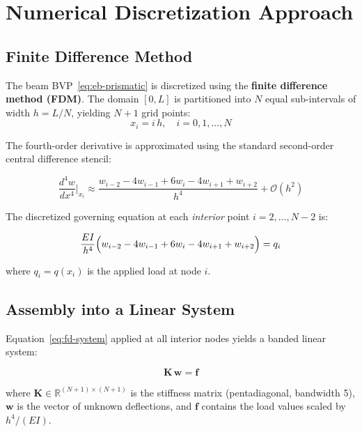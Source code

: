 
\section{Numerical Discretization Approach}

\subsection{Finite Difference Method}

The beam BVP~\eqref{eq:eb-prismatic} is discretized using the \textbf{finite difference method (FDM)}.
The domain $[0, L]$ is partitioned into $N$ equal sub-intervals of width $h = L/N$, yielding $N+1$ grid points:
\[
  x_i = i\,h, \quad i = 0, 1, \ldots, N
\]

The fourth-order derivative is approximated using the standard second-order central difference stencil:

\begin{equation}
  \frac{d^4 w}{dx^4}\bigg|_{x_i}
  \approx
  \frac{w_{i-2} - 4w_{i-1} + 6w_i - 4w_{i+1} + w_{i+2}}{h^4}
  + \mathcal{O}(h^2)
  \label{eq:fd-stencil}
\end{equation}

The discretized governing equation at each \emph{interior} point $i = 2, \ldots, N-2$ is:

\begin{equation}
  \frac{EI}{h^4}\Bigl(w_{i-2} - 4w_{i-1} + 6w_i - 4w_{i+1} + w_{i+2}\Bigr) = q_i
  \label{eq:fd-system}
\end{equation}

where $q_i = q(x_i)$ is the applied load at node $i$.

\subsection{Assembly into a Linear System}

Equation~\eqref{eq:fd-system} applied at all interior nodes yields a banded linear system:

\begin{equation}
  \mathbf{K}\,\mathbf{w} = \mathbf{f}
  \label{eq:linear-system}
\end{equation}

where $\mathbf{K} \in \mathbb{R}^{(N+1)\times(N+1)}$ is the stiffness matrix (pentadiagonal, bandwidth 5), $\mathbf{w}$ is the vector of unknown deflections, and $\mathbf{f}$ contains the load values scaled by $h^4/(EI)$.

